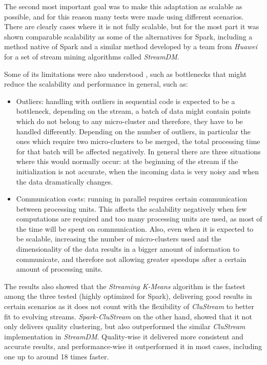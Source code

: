 The second most important goal was to make this adaptation as scalable as possible, and for this reason many tests were made using different scenarios. There are clearly cases where it is not fully scalable, but for the most part it was shown comparable scalability as some of the alternatives for Spark, including a method native of Spark and a similar method developed by a team from \textit{Huawei} for a set of stream mining algorithms called \textit{StreamDM}.

Some of its limitations were also understood , such as bottlenecks that might reduce the scalability and performance in general, such as:

\begin{itemize}
 \item Outliers: handling with outliers in sequential code is expected to be a bottleneck, depending on the stream, a batch of data might contain points which do not belong to any micro-cluster and therefore, they have to be handled differently. Depending on the number of outliers, in particular the ones which require two micro-clusters to be merged, the total processing time for that batch will be affected negatively. In general there are three situations where this would normally occur: at the beginning of the stream if the initialization is not accurate, when the incoming data is very noisy and when the data dramatically changes.
 \item Communication costs: running in parallel requires certain communication between processing units. This affects the scalability negatively when few computations are required and too many processing units are used, as most of the time will be spent on communication. Also, even when it is expected to be scalable, increasing the number of micro-clusters used and the dimensionality of the data results in a bigger amount of information to communicate, and therefore not allowing greater speedups after a certain amount of processing units. 
\end{itemize}

The results also showed that the \textit{Streaming K-Means} algorithm is the fastest among the three tested (highly optimized for Spark), delivering good results in certain scenarios as it does not count with the flexibility of \textit{CluStream} to better fit to evolving streams. \textit{Spark-CluStream} on the other hand, showed that it not only delivers quality clustering, but also outperformed the similar \textit{CluStream} implementation in \textit{StreamDM}. Quality-wise it delivered more consistent and accurate results, and performance-wise it outperformed it in most cases, including one up to around 18 times faster. 
